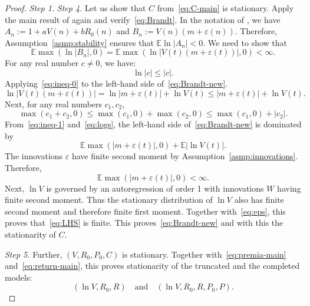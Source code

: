\documentclass[12pt]{amsart}
\begin{document}
\begin{proof} {\it Step 1.}
{\it Step 4.} Let us show that $C$ from~\eqref{eq:C-main} is stationary. Apply the main result of \cite{Brandt} again and verify~\eqref{eq:Brandt}. In the notation of \cite{Brandt}, we have $A_n := 1 + aV(n) + bR_0(n)$ and $B_n := V(n)(m + \varepsilon(n))$. Therefore, Assumption~\ref{asmp:stability} ensures that $\mathbb E\ln|A_n| < 0$. We need to show that
\begin{equation}
\label{eq:Brandt-new}
\mathbb E\max(\ln|B_n|, 0) = \mathbb E\max(\ln|V(t)(m+\varepsilon(t))|, 0) < \infty.
\end{equation}
For any real number $c \ne 0$, we have:
\begin{equation}
\label{eq:ineq-0}
\ln|c| \le |c|.
\end{equation}
Applying~\eqref{eq:ineq-0} to the left-hand side of~\eqref{eq:Brandt-new}. 
\begin{equation}
\label{eq:logs}
\ln|V(t)(m+\varepsilon(t))| = \ln|m + \varepsilon(t)| + \ln V(t) \le |m+\varepsilon(t)| + \ln V(t).
\end{equation}
Next, for any real numbers $c_1, c_2$,  
\begin{equation}
\label{eq:ineq-1}
\max(c_1 + c_2, 0) \le \max(c_1, 0) + \max(c_2, 0) \le \max(c_1, 0) + |c_2|.
\end{equation}
From~\eqref{eq:ineq-1} and~\eqref{eq:logs}, the left-hand side of~\eqref{eq:Brandt-new} is dominated by
\begin{equation}
\label{eq:LHS}
\mathbb E\max(|m + \varepsilon(t)|, 0) + \mathbb E|\ln V(t)|.
\end{equation}
The innovations $\varepsilon$ have finite second moment by Assumption~\ref{asmp:innovations}. Therefore, 
\begin{equation}
\label{eq:eps}
\mathbb E\max(|m + \varepsilon(t)|, 0) < \infty.
\end{equation}
Next, $\ln V$ is governed by an autoregression of order 1 with innovations $W$ having finite second moment. Thus the stationary distribution of $\ln V$ also has finite second moment and therefore finite first moment. Together with~\eqref{eq:eps}, this proves that~\eqref{eq:LHS} is finite. This proves~\eqref{eq:Brandt-new} and with this the stationarity of $C$. 

{\it Step 5.} Further, $(V, R_0, P_0, C)$ is stationary. Together with~\eqref{eq:premia-main} and~\eqref{eq:return-main}, this proves stationarity of the truncated and the completed models:
\begin{equation}
\label{eq:ln-MC}
(\ln V, R_0, R)\quad \mbox{and}\quad (\ln V, R_0, R, P_0, P).
\end{equation}


\end{proof}
\end{document}
